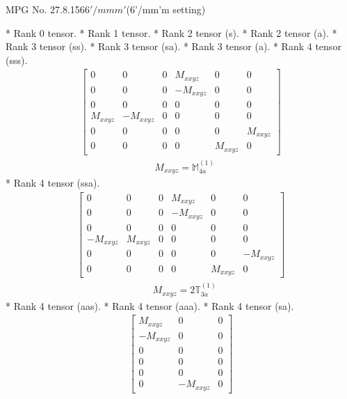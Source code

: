 \documentclass[fleqn,8pt,landscape]{jsarticle}
\begin{document}
\setcounter{MaxMatrixCols}{32}

\renewcommand{\tablename}{Table~}
\renewcommand{\figurename}{Figure~}
\begin{center}
\LARGE
MPG No. 27.8.156\quad$6'/mmm'$\quad(6'/mm'm setting)
\end{center}
* Rank 0 tensor.
* Rank 1 tensor.
* Rank 2 tensor (s).
* Rank 2 tensor (a).
* Rank 3 tensor (ss).
* Rank 3 tensor (sa).
* Rank 3 tensor (a).
* Rank 4 tensor (sss).
\begin{align*}
\begin{bmatrix} 0 & 0 & 0 & M_{xxyz} & 0 & 0 \\ 0 & 0 & 0 & - M_{xxyz} & 0 & 0 \\ 0 & 0 & 0 & 0 & 0 & 0 \\ M_{xxyz} & - M_{xxyz} & 0 & 0 & 0 & 0 \\ 0 & 0 & 0 & 0 & 0 & M_{xxyz} \\ 0 & 0 & 0 & 0 & M_{xxyz} & 0 \end{bmatrix}
\end{align*}
\begin{align*}
& M_{xxyz} = \mathbb{M}_{4a}^{(1)}
\end{align*}
* Rank 4 tensor (ssa).
\begin{align*}
\begin{bmatrix} 0 & 0 & 0 & M_{xxyz} & 0 & 0 \\ 0 & 0 & 0 & - M_{xxyz} & 0 & 0 \\ 0 & 0 & 0 & 0 & 0 & 0 \\ - M_{xxyz} & M_{xxyz} & 0 & 0 & 0 & 0 \\ 0 & 0 & 0 & 0 & 0 & - M_{xxyz} \\ 0 & 0 & 0 & 0 & M_{xxyz} & 0 \end{bmatrix}
\end{align*}
\begin{align*}
& M_{xxyz} = 2 \mathbb{T}_{3a}^{(1)}
\end{align*}
* Rank 4 tensor (aas).
* Rank 4 tensor (aaa).
* Rank 4 tensor (sa).
\begin{align*}
\begin{bmatrix} M_{xxyz} & 0 & 0 \\ - M_{xxyz} & 0 & 0 \\ 0 & 0 & 0 \\ 0 & 0 & 0 \\ 0 & 0 & 0 \\ 0 & - M_{xxyz} & 0 \end{bmatrix}
\end{align*}
\end{document}
